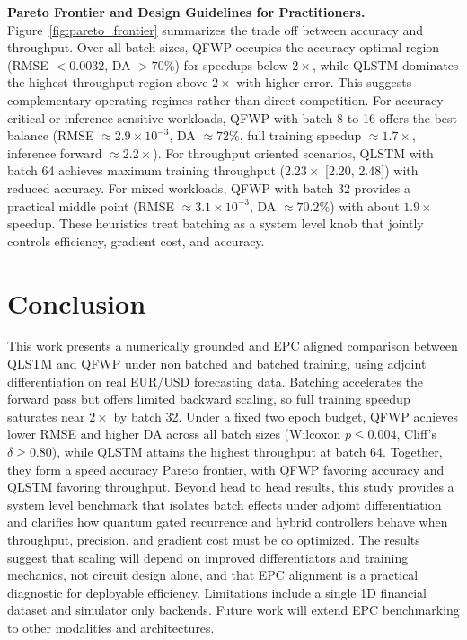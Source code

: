 \documentclass{article}
\begin{document}
\textbf{Pareto Frontier and Design Guidelines for Practitioners.}
Figure~\ref{fig:pareto_frontier} summarizes the trade off between accuracy and throughput. Over all batch sizes, QFWP occupies the accuracy optimal region (RMSE $<0.0032$, DA $>70\%$) for speedups below $2\times$, while QLSTM dominates the highest throughput region above $2\times$ with higher error. This suggests complementary operating regimes rather than direct competition. For accuracy critical or inference sensitive workloads, QFWP with batch 8 to 16 offers the best balance (RMSE $\approx2.9\times10^{-3}$, DA $\approx72\%$, full training speedup $\approx1.7\times$, inference forward $\approx2.2\times$). For throughput oriented scenarios, QLSTM with batch 64 achieves maximum training throughput ($2.23\times$ [2.20, 2.48]) with reduced accuracy. For mixed workloads, QFWP with batch 32 provides a practical middle point (RMSE $\approx3.1\times10^{-3}$, DA $\approx70.2\%$) with about $1.9\times$ speedup. These heuristics treat batching as a system level knob that jointly controls efficiency, gradient cost, and accuracy.




\section{Conclusion}
\label{sec:conclusion}
This work presents a numerically grounded and EPC aligned comparison between QLSTM and QFWP under non batched and batched training, using adjoint differentiation on real EUR/USD forecasting data. Batching accelerates the forward pass but offers limited backward scaling, so full training speedup saturates near $2\times$ by batch 32. Under a fixed two epoch budget, QFWP achieves lower RMSE and higher DA across all batch sizes (Wilcoxon $p\le0.004$, Cliff's $\delta\ge0.80$), while QLSTM attains the highest throughput at batch 64. Together, they form a speed accuracy Pareto frontier, with QFWP favoring accuracy and QLSTM favoring throughput. Beyond head to head results, this study provides a system level benchmark that isolates batch effects under adjoint differentiation and clarifies how quantum gated recurrence and hybrid controllers behave when throughput, precision, and gradient cost must be co optimized. The results suggest that scaling will depend on improved differentiators and training mechanics, not circuit design alone, and that EPC alignment is a practical diagnostic for deployable efficiency. Limitations include a single 1D financial dataset and simulator only backends. Future work will extend EPC benchmarking to other modalities and architectures.
\end{document}
